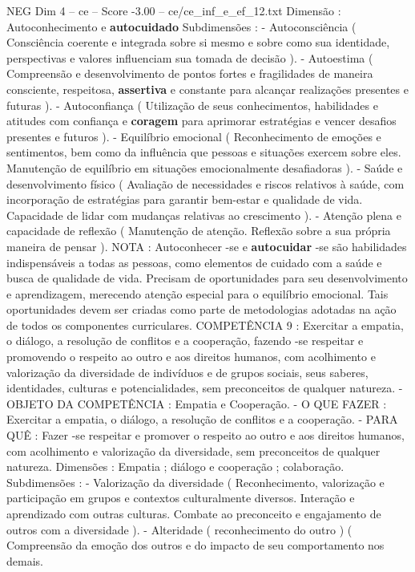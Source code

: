 \begin{textsample}{NEG Dim 4 – ce – Score -3.00 – ce/ce\_inf\_e\_ef\_12.txt}
Dimensão : Autoconhecimento e \textbf{autocuidado} Subdimensões : - Autoconsciência ( Consciência coerente e integrada sobre si mesmo e sobre como sua identidade, perspectivas e valores influenciam sua tomada de decisão ). - Autoestima ( Compreensão e desenvolvimento de pontos fortes e fragilidades de maneira consciente, respeitosa, \textbf{assertiva} e constante para alcançar realizações presentes e futuras ). - Autoconfiança ( Utilização de seus conhecimentos, habilidades e atitudes com confiança e \textbf{coragem} para aprimorar estratégias e vencer desafios presentes e futuros ). - Equilíbrio emocional ( Reconhecimento de emoções e sentimentos, bem como da influência que pessoas e situações exercem sobre eles.
Manutenção de equilíbrio em situações emocionalmente desafiadoras ). - Saúde e desenvolvimento físico ( Avaliação de necessidades e riscos relativos à saúde, com incorporação de estratégias para garantir bem-estar e qualidade de vida.
Capacidade de lidar com mudanças relativas ao crescimento ). - Atenção plena e capacidade de reflexão ( Manutenção de atenção.
Reflexão sobre a sua própria maneira de pensar ).
NOTA : Autoconhecer -se e \textbf{autocuidar} -se são habilidades indispensáveis a todas as pessoas, como elementos de cuidado com a saúde e busca de qualidade de vida.
Precisam de oportunidades para seu desenvolvimento e aprendizagem, merecendo atenção especial para o equilíbrio emocional.
Tais oportunidades devem ser criadas como parte de metodologias adotadas na ação de todos os componentes curriculares.
COMPETÊNCIA 9 : Exercitar a empatia, o diálogo, a resolução de conflitos e a cooperação, fazendo -se respeitar e promovendo o respeito ao outro e aos direitos humanos, com acolhimento e valorização da diversidade de indivíduos e de grupos sociais, seus saberes, identidades, culturas e potencialidades, sem preconceitos de qualquer natureza. - OBJETO DA COMPETÊNCIA : Empatia e Cooperação. - O QUE FAZER : Exercitar a empatia, o diálogo, a resolução de conflitos e a cooperação. - PARA QUÊ : Fazer -se respeitar e promover o respeito ao outro e aos direitos humanos, com acolhimento e valorização da diversidade, sem preconceitos de qualquer natureza.
Dimensões : Empatia ; diálogo e cooperação ; colaboração.
Subdimensões : - Valorização da diversidade ( Reconhecimento, valorização e participação em grupos e contextos culturalmente diversos.
Interação e aprendizado com outras culturas.
Combate ao preconceito e engajamento de outros com a diversidade ). - Alteridade ( reconhecimento do outro ) ( Compreensão da emoção dos outros e do impacto de seu comportamento nos demais.

\end{textsample}
